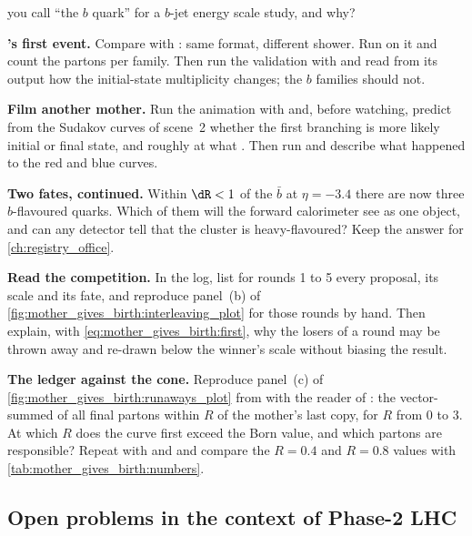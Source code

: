 \begin{exercises}
  you call ``the $b$ quark'' for a $b$-jet energy scale study, and why?
\item \textbf{\PYTHIA's first event.} Compare
   with :
  same format, different shower. Run  on it and
  count the partons per family. Then run the validation with
   and read from its output how the initial-state
  multiplicity changes; the $b$ families should not.
\item \textbf{Film another mother.} Run the animation with
   and, before watching, predict from the
  Sudakov curves of scene~2 whether the first branching is more likely
  initial or final state, and roughly at what \pt. Then run
   and describe what happened to the red
  and blue curves.
\item \textbf{Two fates, continued.} Within $\dR<1$ of the $\bar b$ at $\eta=-3.4$
  there are now three $b$-flavoured quarks. Which of them will the forward
  calorimeter see as one object, and can any detector tell that the
  cluster is heavy-flavoured? Keep the answer for \cref{ch:registry_office}.
\item \textbf{Read the competition.} In the  log, list for rounds
  1 to 5 every proposal, its scale and its fate, and reproduce panel~(b) of
  \cref{fig:mother_gives_birth:interleaving_plot} for those rounds by hand.
  Then explain, with \cref{eq:mother_gives_birth:first}, why the losers of
  a round may be thrown away and re-drawn below the winner's scale without
  biasing the result.
\item \textbf{The ledger against the cone.} Reproduce panel~(c) of
  \cref{fig:mother_gives_birth:runaways_plot} from  with
  the reader of : the vector-summed \pt of all
  final partons within $R$ of the mother's last copy, for $R$ from $0$ to
  $3$. At which $R$ does the curve first exceed the Born value, and which
  partons are responsible? Repeat with  and  and
  compare the $R=0.4$ and $R=0.8$ values with \cref{tab:mother_gives_birth:numbers}.
\end{exercises}

\subsection*{Open problems in the context of Phase-2 LHC}
\label{sec:mother_gives_birth:open_problems}

